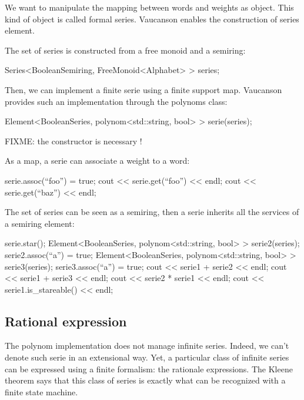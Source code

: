 \documentclass{article}
\begin{document}
\begin{code}
We want to manipulate the mapping between words and weights as object.
This kind of object is called formal series. Vaucanson enables the
construction of series element. 

The set of series is constructed from a free monoid and a semiring:

\begin{code}
Series<BooleanSemiring, FreeMonoid<Alphabet> > series; 
\end{code}

Then, we can implement a finite serie using a finite support map.
Vaucanson provides such an implementation through the polynoms class:

\begin{code}[A serie]
Element<BooleanSeries, polynom<std::string, bool> > serie(series);
\end{code}

FIXME: the constructor is necessary !

As a map, a serie can associate a weight to a word:

\begin{code}
serie.assoc(``foo'') = true;
cout << serie.get(``foo'') << endl;
cout << serie.get(``baz'') << endl;
\end{code}

The set of series can be seen as a semiring, then a serie inherits all
the services of a semiring element:

\begin{code}
serie.star();
Element<BooleanSeries, polynom<std::string, bool> > serie2(series);
serie2.assoc(``a'') = true;
Element<BooleanSeries, polynom<std::string, bool> > serie3(series);
serie3.assoc(``a'') = true;
cout << serie1 + serie2 << endl;
cout << serie1 + serie3 << endl;
cout << serie2 * serie1 << endl;
cout << serie1.is_stareable() << endl;
\end{code}

\subsection{Rational expression}

The polynom implementation does not manage infinite series. Indeed, we
can't denote such serie in an extensional way. Yet, a particular class
of infinite series can be expressed using a finite formalism: the
rationale expressions. The Kleene theorem says that this class of
series is exactly what can be recognized with a finite state machine.


\end{code}
\end{document}
